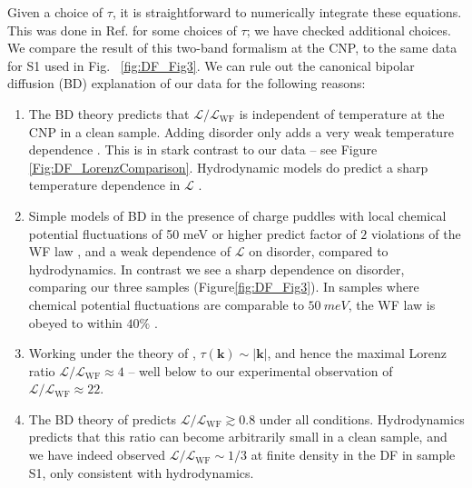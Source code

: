 Given a choice of $\tau$,  it is straightforward to numerically integrate these equations.  This was done in Ref. \cite{yoshino_significant_2015} for some choices of $\tau$; we have checked additional choices.   We compare the result of this two-band formalism at the CNP, to the same data for S1 used in Fig. ~\ref{fig:DF_Fig3}.    We can rule out the canonical bipolar diffusion (BD) explanation of our data for the following reasons: 
\begin{enumerate}
\item The BD theory predicts that   $\mathcal{L}/\mathcal{L}_{\mathrm{WF}}$ is independent of temperature at the CNP in a clean sample.    Adding disorder only adds a very weak temperature dependence \cite{yoshino_significant_2015}.  This is in stark contrast to our data -- see Figure \ref{Fig:DF_LorenzComparison}.   Hydrodynamic models do predict a sharp temperature dependence in $\mathcal{L}$ \cite{lucas_transport_2016}.

\item  Simple models of BD in the presence of charge puddles with local chemical potential fluctuations of 50 meV or higher predict factor of $2$ violations of the WF law \cite{yoshino_significant_2015}, and a weak dependence of $\mathcal{L}$ on disorder, compared to hydrodynamics. In contrast we see a sharp dependence on disorder, comparing our three samples (Figure\ref{fig:DF_Fig3}). In samples where chemical potential fluctuations are comparable to $50~meV$, the WF law is obeyed to within $40\%$ \cite{fong_ultrasensitive_2012}.

\item Working under the theory of \cite{hwang_screening-induced_2009}, $\tau(\mathbf{k}) \sim |\mathbf{k}|$, and hence the maximal Lorenz ratio $\mathcal{L}/\mathcal{L}_{\mathrm{WF}}\approx 4$ \cite{yoshino_significant_2015}  -- well below to our experimental observation of $\mathcal{L}/\mathcal{L}_{\mathrm{WF}}\approx 22$.


\item The BD theory of \cite{yoshino_significant_2015} predicts $\mathcal{L}/\mathcal{L}_{\mathrm{WF}} \gtrsim 0.8$ under all conditions.   Hydrodynamics predicts that this ratio can become arbitrarily small in a clean sample, and we have indeed observed $\mathcal{L}/\mathcal{L}_{\mathrm{WF}} \sim 1/3$ at finite density in the DF in sample S1, only consistent with hydrodynamics.

\end{enumerate}